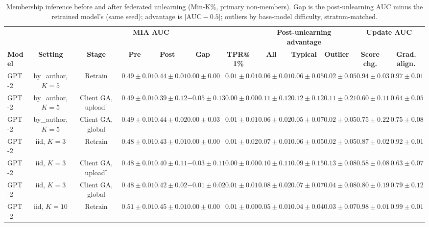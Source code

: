 \begin{table}[t]
\centering
\caption{Membership inference before and after federated unlearning (Min-K\%, primary non-members). Gap is the post-unlearning AUC minus the retrained model's (same seed); advantage is $|\mathrm{AUC}-0.5|$; outliers by base-model difficulty, stratum-matched.}
\label{tab:federated-min-k-prob-primary}
\footnotesize
\renewcommand{\arraystretch}{1.2}
\setlength{\tabcolsep}{2pt}
\begin{tabular*}{\textwidth}{@{\extracolsep{\fill}}lccccccccccc@{}}
\toprule
 & & & \multicolumn{2}{c}{\textbf{MIA AUC}} & & & \multicolumn{3}{c}{\textbf{Post-unlearning advantage}} & \multicolumn{2}{c}{\textbf{Update AUC}} \\
\cmidrule(lr){4-5}\cmidrule(lr){8-10}\cmidrule(lr){11-12}
\textbf{Model} & \textbf{Setting} & \textbf{Stage} & \textbf{Pre} & \textbf{Post} & \textbf{Gap} & \textbf{TPR@1\%} & \textbf{All} & \textbf{Typical} & \textbf{Outlier} & \textbf{Score chg.} & \textbf{Grad. align.} \\
\midrule
GPT-2 & by\_author, $K=5$ & Retrain & $0.49 \pm 0.01$ & $0.44 \pm 0.01$ & $0.00 \pm 0.00$ & $0.01 \pm 0.01$ & $0.06 \pm 0.01$ & $0.06 \pm 0.05$ & $0.02 \pm 0.05$ & $0.94 \pm 0.03$ & $0.97 \pm 0.01$ \\
GPT-2 & by\_author, $K=5$ & Client GA, upload$^{\dagger}$ & $0.49 \pm 0.01$ & $0.39 \pm 0.12$ & $-0.05 \pm 0.13$ & $0.00 \pm 0.00$ & $0.11 \pm 0.12$ & $0.12 \pm 0.12$ & $0.11 \pm 0.21$ & $0.60 \pm 0.11$ & $0.64 \pm 0.05$ \\
GPT-2 & by\_author, $K=5$ & Client GA, global & $0.49 \pm 0.01$ & $0.44 \pm 0.02$ & $0.00 \pm 0.03$ & $0.01 \pm 0.01$ & $0.06 \pm 0.02$ & $0.05 \pm 0.07$ & $0.02 \pm 0.05$ & $0.75 \pm 0.22$ & $0.75 \pm 0.08$ \\
GPT-2 & iid, $K=3$ & Retrain & $0.48 \pm 0.01$ & $0.43 \pm 0.01$ & $0.00 \pm 0.00$ & $0.01 \pm 0.02$ & $0.07 \pm 0.01$ & $0.06 \pm 0.05$ & $0.02 \pm 0.05$ & $0.87 \pm 0.02$ & $0.92 \pm 0.01$ \\
GPT-2 & iid, $K=3$ & Client GA, upload$^{\dagger}$ & $0.48 \pm 0.01$ & $0.40 \pm 0.11$ & $-0.03 \pm 0.11$ & $0.00 \pm 0.00$ & $0.10 \pm 0.11$ & $0.09 \pm 0.15$ & $0.13 \pm 0.08$ & $0.58 \pm 0.08$ & $0.63 \pm 0.07$ \\
GPT-2 & iid, $K=3$ & Client GA, global & $0.48 \pm 0.01$ & $0.42 \pm 0.02$ & $-0.01 \pm 0.02$ & $0.01 \pm 0.01$ & $0.08 \pm 0.02$ & $0.07 \pm 0.07$ & $0.04 \pm 0.08$ & $0.80 \pm 0.19$ & $0.79 \pm 0.12$ \\
GPT-2 & iid, $K=10$ & Retrain & $0.51 \pm 0.01$ & $0.45 \pm 0.01$ & $0.00 \pm 0.00$ & $0.01 \pm 0.00$ & $0.05 \pm 0.01$ & $0.04 \pm 0.04$ & $0.03 \pm 0.07$ & $0.98 \pm 0.01$ & $0.99 \pm 0.01$ \\

\end{tabular*}
\end{table}
